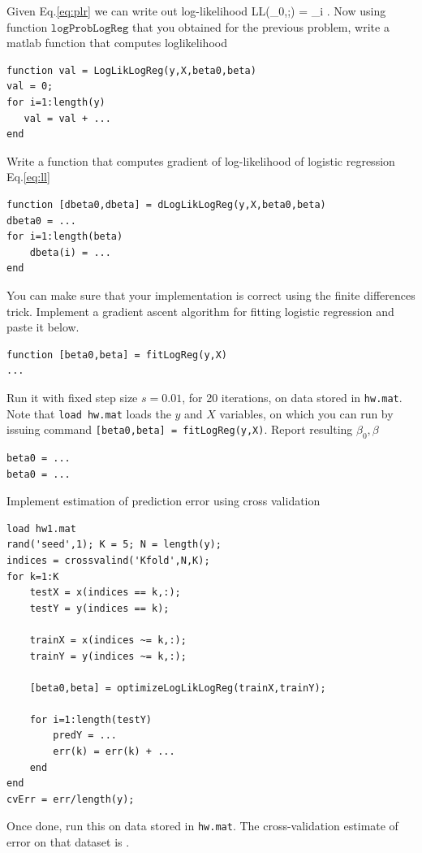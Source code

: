 \documentclass{article}
\begin{document}
\newproblem{1pt}
Given Eq.\eqref{eq:plr} we can write out log-likelihood
\BEQ \label{eq:ll}
\textrm{LL}(\beta_0,\beta;) = \sum_i \log {}.
\EEQ
Now using function $\texttt{logProbLogReg}$ that you obtained for the previous problem, write a matlab function that computes loglikelihood
\begin{verbatim}
function val = LogLikLogReg(y,X,beta0,beta)
val = 0;
for i=1:length(y)
   val = val + ...
end
\end{verbatim}
\newproblem{1pt}
Write a function that computes gradient of log-likelihood of logistic regression Eq.\eqref{eq:ll}
\begin{verbatim}
function [dbeta0,dbeta] = dLogLikLogReg(y,X,beta0,beta)
dbeta0 = ...
for i=1:length(beta)
    dbeta(i) = ...
end
\end{verbatim}
You can make sure that your implementation is correct using the finite differences trick.
\newproblem{1pt}
Implement a gradient ascent algorithm for fitting logistic regression and paste it below.
\begin{verbatim}
function [beta0,beta] = fitLogReg(y,X)
...
\end{verbatim}
Run it with fixed step size $s=0.01$, for 20 iterations, on data stored in \texttt{hw\theHW.mat}.
Note that \texttt{load hw\theHW.mat} loads the $y$ and $X$ variables, on which you can run by issuing command
\texttt{[beta0,beta] = fitLogReg(y,X)}.
Report resulting $\beta_0,\beta$
\begin{verbatim}
beta0 = ...
beta0 = ...
\end{verbatim}
\newproblem{1pt}
Implement estimation of prediction error using cross validation
\begin{verbatim}
load hw1.mat
rand('seed',1); K = 5; N = length(y);
indices = crossvalind('Kfold',N,K);
for k=1:K
    testX = x(indices == k,:);
    testY = y(indices == k);

    trainX = x(indices ~= k,:);
    trainY = y(indices ~= k,:);

    [beta0,beta] = optimizeLogLikLogReg(trainX,trainY);

    for i=1:length(testY)
        predY = ...
        err(k) = err(k) + ...
    end
end
cvErr = err/length(y);
\end{verbatim}
Once done, run this on data stored in \texttt{hw\theHW.mat}. The cross-validation estimate of error on that dataset is \answer.
\end{document}
